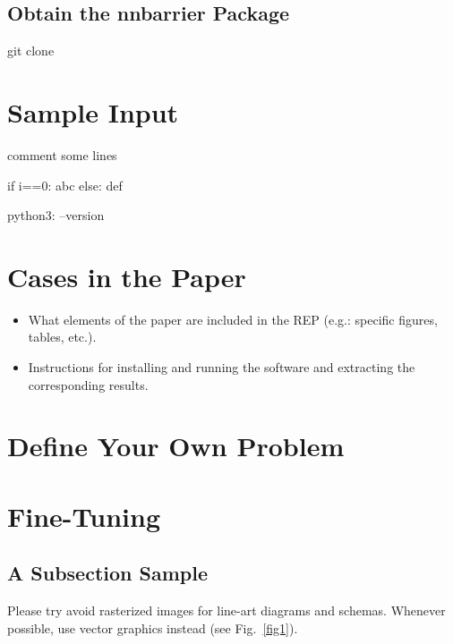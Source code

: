 \documentclass{llncs}
\begin{document}
\subsection{Obtain the \textsf{nnbarrier} Package}




git clone

\section{Sample Input}

comment some lines






\begin{python}
    if i==0:
        abc
    else:
        def
\end{python}
python3: --version 




\section{Cases in the Paper}

\begin{itemize}
    \item What elements of the paper are included in the REP (e.g.: specific figures, tables, etc.).
    \item Instructions for installing and running the software and extracting the corresponding results. 
\end{itemize}

\section{Define Your Own Problem}

\section{Fine-Tuning}

\subsection{A Subsection Sample}

Please \cite{Prajna04safetyverification} try \cite{BarryICRA2012} avoid rasterized images for line-art diagrams and
schemas. Whenever possible, use vector graphics instead (see
Fig.~\ref{fig1}).
\end{document}
